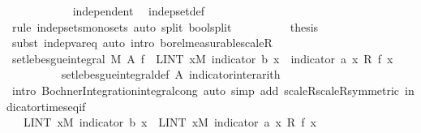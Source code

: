 \begin{isabellebody}
\ \ \ \ \ \ \ \ \ \ \isamarkupfalse%
\ independent\ \isamarkupfalse%
\ indep{\isacharunderscore}{\kern0pt}set{\isacharunderscore}{\kern0pt}def\ \isamarkupfalse%
\ {\isacharparenleft}{\kern0pt}rule\ indep{\isacharunderscore}{\kern0pt}sets{\isacharunderscore}{\kern0pt}mono{\isacharunderscore}{\kern0pt}sets{\isacharcomma}{\kern0pt}\ auto\ split{\isacharcolon}{\kern0pt}\ bool{\isachardot}{\kern0pt}split{\isacharparenright}{\kern0pt}\isanewline
\ \ \ \ \ \ \ \ \isamarkupfalse%
\ {\isacharquery}{\kern0pt}thesis\ \isamarkupfalse%
\ {\isacharparenleft}{\kern0pt}subst\ indep{\isacharunderscore}{\kern0pt}var{\isacharunderscore}{\kern0pt}eq{\isacharcomma}{\kern0pt}\ auto\ intro{\isacharbang}{\kern0pt}{\isacharcolon}{\kern0pt}\ borel{\isacharunderscore}{\kern0pt}measurable{\isacharunderscore}{\kern0pt}scaleR{\isacharparenright}{\kern0pt}\isanewline
\ \ \ \ \ \ \isamarkupfalse%
\isanewline
\ \ \isanewline
\ \ \ \ \ \ \isamarkupfalse%
\ {\isachardoublequoteopen}set{\isacharunderscore}{\kern0pt}lebesgue{\isacharunderscore}{\kern0pt}integral\ M\ A\ f\ {\isacharequal}{\kern0pt}\ {\isacharparenleft}{\kern0pt}LINT\ x{\isacharbar}{\kern0pt}M{\isachardot}{\kern0pt}\ indicator\ b\ x\ {\isacharasterisk}{\kern0pt}\ {\isacharparenleft}{\kern0pt}indicator\ a\ x\ {\isacharasterisk}{\kern0pt}\isactrlsub R\ f\ x{\isacharparenright}{\kern0pt}{\isacharparenright}{\kern0pt}{\isachardoublequoteclose}\isanewline
\ \ \ \ \ \ \ \ \isamarkupfalse%
\ set{\isacharunderscore}{\kern0pt}lebesgue{\isacharunderscore}{\kern0pt}integral{\isacharunderscore}{\kern0pt}def\ A\ indicator{\isacharunderscore}{\kern0pt}inter{\isacharunderscore}{\kern0pt}arith\ \isanewline
\ \ \ \ \ \ \ \ \isamarkupfalse%
\ {\isacharparenleft}{\kern0pt}intro\ Bochner{\isacharunderscore}{\kern0pt}Integration{\isachardot}{\kern0pt}integral{\isacharunderscore}{\kern0pt}cong{\isacharcomma}{\kern0pt}\ auto\ simp\ add{\isacharcolon}{\kern0pt}\ scaleR{\isacharunderscore}{\kern0pt}scaleR{\isacharbrackleft}{\kern0pt}symmetric{\isacharbrackright}{\kern0pt}\ indicator{\isacharunderscore}{\kern0pt}times{\isacharunderscore}{\kern0pt}eq{\isacharunderscore}{\kern0pt}if{\isacharparenleft}{\kern0pt}{}{\isacharparenright}{\kern0pt}{\isacharparenright}{\kern0pt}\isanewline
\ \ \ \ \ \ \isamarkupfalse%
\ \isamarkupfalse%
\ {\isachardoublequoteopen}{\isachardot}{\kern0pt}{\isachardot}{\kern0pt}{\isachardot}{\kern0pt}\ {\isacharequal}{\kern0pt}\ {\isacharparenleft}{\kern0pt}LINT\ x{\isacharbar}{\kern0pt}M{\isachardot}{\kern0pt}\ indicator\ b\ x{\isacharparenright}{\kern0pt}\ {\isacharasterisk}{\kern0pt}\ {\isacharparenleft}{\kern0pt}LINT\ x{\isacharbar}{\kern0pt}M{\isachardot}{\kern0pt}\ indicator\ a\ x\ {\isacharasterisk}{\kern0pt}\isactrlsub R\ f\ x{\isacharparenright}{\kern0pt}{\isachardoublequoteclose}\ \isanewline

\end{isabellebody}
